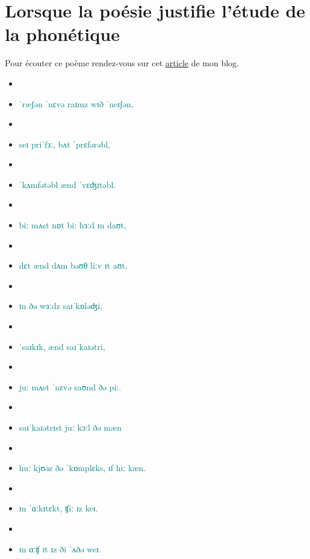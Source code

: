 
\chapter{Lorsque la poésie justifie l'étude de la phonétique}

Pour écouter ce poème rendez-vous sur cet
\href{http://doyouspeakenglish.fr/un-poeme-qui-justifie-letude-de-la-phonetique/}{article}
de mon blog.
\begin{itemize}
\item {}
\item \textcolor{teal}{ˈræʃən ˈnɛvə raɪmz wɪð ˈneɪʃən,}
\item {}
\item \textcolor{teal}{seɪ priˈfɜː, bʌt ˈprɛfərəbl,}
\item {}
\item \textcolor{teal}{ˈkʌmfətəbl ænd ˈvɛʤɪtəbl.}
\item {}
\item \textcolor{teal}{biː mʌst nɒt biː hɜːd ɪn daʊt,}
\item {}
\item \textcolor{teal}{dɛt ænd dʌm bəʊθ liːv ɪt aʊt,}
\item {}
\item \textcolor{teal}{ɪn ðə wɜːdz saɪˈkɒləʤi,}
\item {}
\item \textcolor{teal}{ˈsaɪkɪk, ænd saɪˈkaɪətri,}
\item {}
\item \textcolor{teal}{juː mʌst ˈnɛvə saʊnd ðə piː.}
\item {}
\item \textcolor{teal}{saɪˈkaɪətrɪst juː kɔːl ðə mæn}
\item {}
\item \textcolor{teal}{huː kjʊəz ðə ˈkɒmplɛks, ɪf hiː kæn.}
\item {}
\item \textcolor{teal}{ɪn ˈɑːkɪtɛkt, ʧiː ɪz keɪ.}
\item {}
\item \textcolor{teal}{ɪn ɑːʧ ɪt ɪz ði ˈʌðə weɪ.}

\end{itemize}
